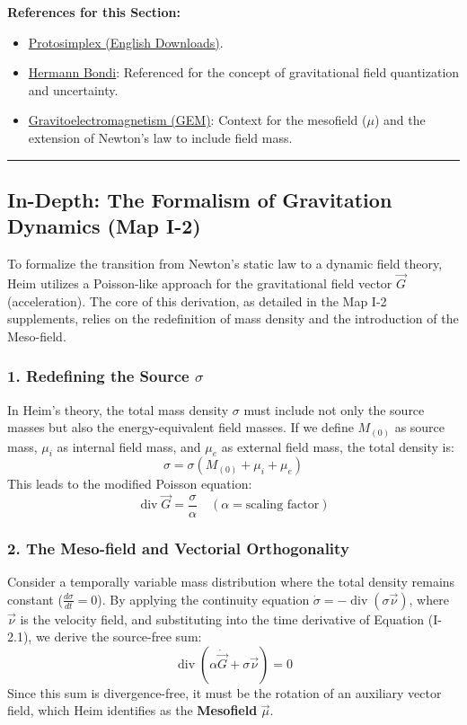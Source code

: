 \documentclass[11pt,a4paper,oneside]{article}
\newenvironment{sectionrefs}
  {\par\vspace{1em}\noindent\textbf{\textsf{References for this Section:}}\begin{itemize}[leftmargin=*, label={\scriptsize$\blacksquare$}, itemsep=2pt]}
  {\end{itemize}}
\newcommand{\hr}{\par\vspace{2em}\noindent\rule{\linewidth}{0.4pt}\par\vspace{2em}}
\begin{document}
\begin{sectionrefs}
    \item \href{https://www.engon.de/protosimplex/index_e.htm}{Protosimplex (English Downloads)}.
    \item \href{https://en.wikipedia.org/wiki/Hermann_Bondi}{Hermann Bondi}: Referenced for the concept of gravitational field quantization and uncertainty.
    \item \href{https://en.wikipedia.org/wiki/Gravitoelectromagnetism}{Gravitoelectromagnetism (GEM)}: Context for the mesofield ($\mu$) and the extension of Newton's law to include field mass.
\end{sectionrefs}

\hr

\subsection*{In-Depth: The Formalism of Gravitation Dynamics (Map I-2)}

To formalize the transition from Newton's static law to a dynamic field theory, Heim utilizes a Poisson-like approach for the gravitational field vector $\vec{G}$ (acceleration). The core of this derivation, as detailed in the Map I-2 supplements, relies on the redefinition of mass density and the introduction of the Meso-field.

\subsubsection*{1. Redefining the Source $\sigma$}
In Heim's theory, the total mass density $\sigma$ must include not only the source masses but also the energy-equivalent field masses. If we define $M_{(0)}$ as source mass, $\mu_i$ as internal field mass, and $\mu_e$ as external field mass, the total density is:
\begin{equation}
    \sigma = \sigma(M_{(0)} + \mu_i + \mu_e)
\end{equation}
This leads to the modified Poisson equation:
\begin{equation}
    \operatorname{div} \vec{G} = \frac{\sigma}{\alpha} \quad (\alpha = \text{scaling factor})
\tag{I-2.1}
\end{equation}

\subsubsection*{2. The Meso-field and Vectorial Orthogonality}
Consider a temporally variable mass distribution where the total density remains constant ($\frac{d\sigma}{dt} = 0$). By applying the continuity equation $\dot{\sigma} = -\operatorname{div}(\sigma \vec{\nu})$, where $\vec{\nu}$ is the velocity field, and substituting into the time derivative of Equation (I-2.1), we derive the source-free sum:
\begin{equation}
    \operatorname{div}(\alpha \dot{\vec{G}} + \sigma \vec{\nu}) = 0
\end{equation}
Since this sum is divergence-free, it must be the rotation of an auxiliary vector field, which Heim identifies as the \textbf{Mesofield} $\vec{\mu}$.
\end{document}
